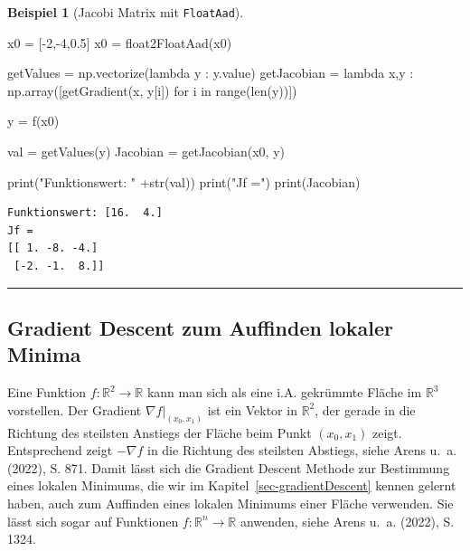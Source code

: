 \documentclass[
  a4paper,
  DIV=11]{scrreprt}
\newenvironment{Shaded}{\begin{snugshade}}{\end{snugshade}}
\newcommand{\BuiltInTok}[1]{\textcolor[rgb]{0.00,0.23,0.31}{#1}}
\newcommand{\ControlFlowTok}[1]{\textcolor[rgb]{0.00,0.23,0.31}{#1}}
\newcommand{\DecValTok}[1]{\textcolor[rgb]{0.68,0.00,0.00}{#1}}
\newcommand{\FloatTok}[1]{\textcolor[rgb]{0.68,0.00,0.00}{#1}}
\newcommand{\KeywordTok}[1]{\textcolor[rgb]{0.00,0.23,0.31}{#1}}
\newcommand{\NormalTok}[1]{\textcolor[rgb]{0.00,0.23,0.31}{#1}}
\newcommand{\OperatorTok}[1]{\textcolor[rgb]{0.37,0.37,0.37}{#1}}
\newcommand{\StringTok}[1]{\textcolor[rgb]{0.13,0.47,0.30}{#1}}
\theoremstyle{definition}
\theoremstyle{definition}
\newtheorem{example}{Beispiel}[chapter]
\theoremstyle{remark}
\begin{document}
\begin{example}[Jacobi Matrix mit
\texttt{FloatAad}]
\begin{Shaded}
\begin{Highlighting}[]
\NormalTok{x0 }\OperatorTok{=}\NormalTok{ [}\OperatorTok{{-}}\DecValTok{2}\NormalTok{,}\OperatorTok{{-}}\DecValTok{4}\NormalTok{,}\FloatTok{0.5}\NormalTok{]}
\NormalTok{x0 }\OperatorTok{=}\NormalTok{ float2FloatAad(x0)}

\NormalTok{getValues }\OperatorTok{=}\NormalTok{ np.vectorize(}\KeywordTok{lambda}\NormalTok{ y : y.value)}
\NormalTok{getJacobian }\OperatorTok{=} \KeywordTok{lambda}\NormalTok{ x,y : np.array([getGradient(x, y[i]) }\ControlFlowTok{for}\NormalTok{ i }\KeywordTok{in} \BuiltInTok{range}\NormalTok{(}\BuiltInTok{len}\NormalTok{(y))])}

\NormalTok{y }\OperatorTok{=}\NormalTok{ f(x0)}

\NormalTok{val }\OperatorTok{=}\NormalTok{ getValues(y)}
\NormalTok{Jacobian }\OperatorTok{=}\NormalTok{ getJacobian(x0, y)}

\BuiltInTok{print}\NormalTok{(}\StringTok{"Funktionswert: "} \OperatorTok{+}\BuiltInTok{str}\NormalTok{(val))}
\BuiltInTok{print}\NormalTok{(}\StringTok{"Jf ="}\NormalTok{)}
\BuiltInTok{print}\NormalTok{(Jacobian)}
\end{Highlighting}
\end{Shaded}

\begin{verbatim}
Funktionswert: [16.  4.]
Jf =
[[ 1. -8. -4.]
 [-2. -1.  8.]]
\end{verbatim}

\end{example}

\begin{center}\rule{0.5\linewidth}{0.5pt}\end{center}

\hypertarget{gradient-descent-zum-auffinden-lokaler-minima}{%
\subsection{Gradient Descent zum Auffinden lokaler
Minima}\label{gradient-descent-zum-auffinden-lokaler-minima}}

Eine Funktion \(f : \mathbb{R}^2 \rightarrow \mathbb{R}\) kann man sich
als eine i.A. gekrümmte Fläche im \(\mathbb{R}^3\) vorstellen. Der
Gradient \(\nabla f|_{(x_0, x_1)}\) ist ein Vektor in \(\mathbb{R}^2\),
der gerade in die Richtung des steilsten Anstiegs der Fläche beim Punkt
\((x_0, x_1)\) zeigt. Entsprechend zeigt \(-\nabla f\) in die Richtung
des steilsten Abstiegs, siehe Arens u.~a. (2022), S. 871. Damit lässt
sich die Gradient Descent Methode zur Bestimmung eines lokalen Minimums,
die wir im Kapitel~\ref{sec-gradientDescent} kennen gelernt haben, auch
zum Auffinden eines lokalen Minimums einer Fläche verwenden. Sie lässt
sich sogar auf Funktionen \(f : \mathbb{R}^n \rightarrow \mathbb{R}\)
anwenden, siehe Arens u.~a. (2022), S. 1324.
\end{document}
